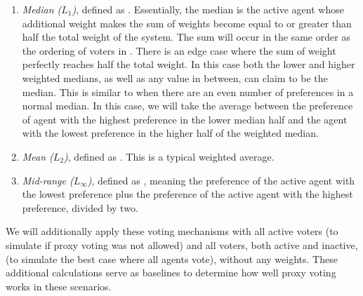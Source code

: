 \begin{enumerate}
    \item {
        \textit{Median ($L_1$)}, defined as
        $$.
        Essentially, the median is the active agent whose additional weight makes the
        sum of weights become equal to or greater than half the total weight of the
        system.
        The sum will occur in the same order as the ordering of voters in
        \systemproxies.
        There is an edge case where the sum of weight perfectly reaches half the
        total weight.
        In this case both the lower and higher weighted medians, as well as any value
        in between, can claim to be the median.
        This is similar to when there are an even number of preferences in a normal
        median.
        In this case, we will take the average between the preference of agent with
        the highest preference in the lower median half and the agent with the lowest
        preference in the higher half of the weighted median.
    }
    \item {
        \textit{Mean ($L_2$)}, defined as
        $$.
        This is a typical weighted average.
    }
    \item {
        \textit{Mid-range ($L_\infty$)}, defined as
        $$, meaning the preference
        of the active agent with the lowest preference plus the preference of the
        active agent with the highest preference, divided by two.
    }
\end{enumerate}
We will additionally apply these voting mechanisms with all active voters (to simulate
if proxy voting was not allowed) and all voters, both active and inactive, (to simulate
the best case where all agents vote), without any weights.
These additional calculations serve as baselines to determine how well proxy voting
works in these scenarios.

